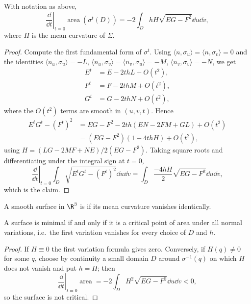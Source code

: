 \begin{proposition}
    With notation as above,
    $$
    \left.\frac{\dd}{\dd t}\right|_{t=0}\operatorname{area}\left(\sigma^t(D)\right) = -2\int_D h H \sqrt{EG-F^2}\dd u \dd v,
    $$
    where $H$ is the mean curvature of $\Sigma$.
\end{proposition}
\begin{proof}
    Compute the first fundamental form of $\sigma^t$. Using $\langle n, \sigma_u\rangle = \langle n, \sigma_v\rangle = 0$ and the identities $\langle n_u, \sigma_u\rangle = -L$, $\langle n_u,\sigma_v\rangle = \langle n_v,\sigma_u\rangle = -M$, $\langle n_v, \sigma_v\rangle = -N$, we get
    \begin{align*}
        E^t &= E - 2thL + O(t^2), \\
        F^t &= F - 2thM + O(t^2), \\
        G^t &= G - 2thN + O(t^2),
    \end{align*}
    where the $O(t^2)$ terms are smooth in $(u,v,t)$. Hence
    $$
    \begin{aligned}
    E^tG^t - (F^t)^2 &= EG-F^2 - 2th\left(EN - 2FM + GL\right) + O(t^2) \\
    &= (EG-F^2)\left(1 - 4thH\right) + O(t^2),
    \end{aligned}
    $$
    using $H = (LG-2MF+NE)/2(EG-F^2)$. Taking square roots and differentiating under the integral sign at $t = 0$,
    $$
    \left.\frac{\dd}{\dd t}\right|_{t=0}\int_D\sqrt{E^tG^t-(F^t)^2}\dd u\dd v = \int_D \frac{-4hH}{2}\sqrt{EG-F^2}\dd u \dd v,
    $$
    which is the claim.
\end{proof}

\begin{definition}
    A smooth surface in $\R^3$ is  if its mean curvature vanishes identically.
\end{definition}

\begin{corollary}
    A surface is minimal if and only if it is a critical point of area under all normal variations, i.e.\ the first variation vanishes for every choice of $D$ and $h$.
\end{corollary}
\begin{proof}
    If $H \equiv 0$ the first variation formula gives zero. Conversely, if $H(q) \neq 0$ for some $q$, choose by continuity a small domain $D$ around $\sigma^{-1}(q)$ on which $H$ does not vanish and put $h = H$; then
    $$
    \left.\frac{\dd}{\dd t}\right|_{t=0}\operatorname{area} = -2\int_D H^2\sqrt{EG-F^2}\dd u \dd v < 0,
    $$
    so the surface is not critical.
\end{proof}

